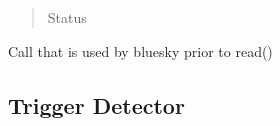 \documentclass[letterpaper,10pt,english]{sphinxmanual}
\begin{document}
\begin{fulllineitems}
\begin{fulllineitems}
\begin{quote}
\begin{description}
\sphinxAtStartPar
Status

\end{description}\end{quote}

\end{fulllineitems}


\begin{fulllineitems}
\label{\detokenize{API:raypyng_bluesky.detector.RaypyngDetector.trigger}}
\pysigstartsignatures
{}
\pysigstopsignatures
\sphinxAtStartPar
Call that is used by bluesky prior to read()

\end{fulllineitems}


\end{fulllineitems}



\subsection{Trigger Detector}
\label{\detokenize{API:trigger-detector}}
\end{document}
